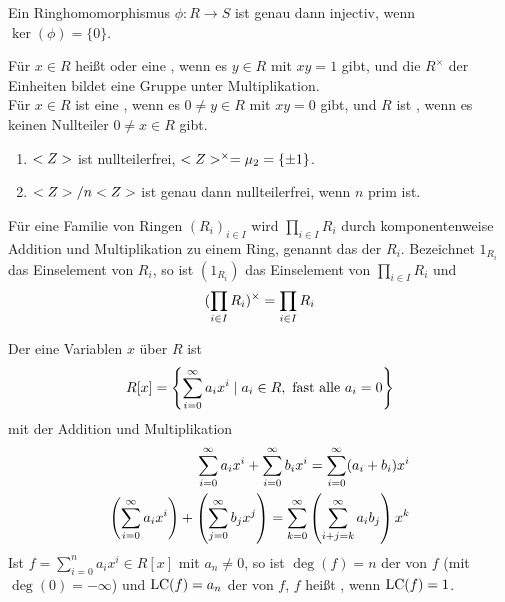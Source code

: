 \begin{proposition}
	Ein Ringhomomorphismus $\phi: R \to S$ ist genau dann injectiv, wenn $\ker(\phi) =\{0\}$.
\end{proposition}

\begin{definition}
	Für $x \in R$ heißt  oder eine , wenn es $y\in R$ mit $xy=1$ gibt, und die $R^{\times}$ der Einheiten bildet eine Gruppe unter Multiplikation.\\
	Für $x \in R$ ist eine , wenn es $0 \neq y \in R$ mit $xy=0$ gibt, und $R$ ist , wenn es keinen Nullteiler $0\neq x \in R$ gibt.
\end{definition}

\begin{example}
	\begin{enumerate}
		\item $<Z>$ ist nullteilerfrei, $<Z>^{\times} = \mu_2 = \{ \pm 1 \}$.
		\item $<Z> / n <Z>$ ist genau dann nullteilerfrei, wenn $n$ prim ist.
	\end{enumerate}
\end{example}

\begin{example}
	Für eine Familie von Ringen $(R_i)_{i \in I}$ wird $\prod_{i \in I} R_i$ durch komponentenweise Addition und Multiplikation zu einem Ring, genannt das  der $R_i$. Bezeichnet $1_{R_i}$ das Einselement von $R_i$, so ist $(1_{R_i})$ das Einselement von $\prod_{i \in I} R_i$ und 
	\begin{align}
		(\prod_{i\in I} R_i)^{\times} = \prod_{i \in I}R_i \notag
	\end{align}
\end{example}

\begin{example}
	Der  eine Variablen $x$ über $R$ ist 
	\begin{align}
		R[x] = \left\{ \sum_{i=0}^{\infty} a_i x^i \mid a_i \in R, \text{ fast alle } a_i = 0\right\} \notag
	\end{align}
	mit der Addition und Multiplikation
	\begin{align}
		\sum_{i=0}^{\infty} a_i x^i + \sum_{i=0}^{\infty} b_i x^i = \sum_{i=0}^{\infty} (a_i + b_i) x^i \notag \\
		\left(\sum_{i=0}^{\infty} a_i x^i\right) + \left(\sum_{j=0}^{\infty} b_j x^j\right) = \sum_{k=0}^{\infty} \left(\sum_{i+j=k}^{\infty} a_i b_j\right) x^k \notag
	\end{align}
	Ist $f = \sum_{i=0}^n a_i x^i \in R[x]$ mit $a_n \neq 0$, so ist $\deg(f) = n$ der  von $f$ (mit $\deg(0) = -\infty$) und $\operatorname{LC}(f) = a_n$ der  von $f$, $f$ heißt , wenn $\operatorname{LC}(f) = 1$.
\end{example}


